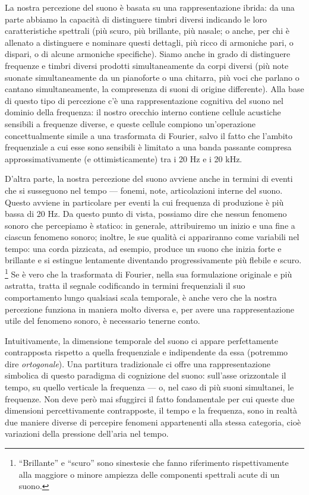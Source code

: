 La nostra percezione del suono è basata su una rappresentazione ibrida: da una parte abbiamo la capacità di distinguere timbri diversi indicando le loro caratteristiche spettrali (più scuro, più brillante, più nasale; o anche, per chi è allenato a distinguere e nominare questi dettagli, più ricco di armoniche pari, o dispari, o di alcune armoniche specifiche). Siamo anche in grado di distinguere frequenze e timbri diversi prodotti simultaneamente da corpi diversi (più note suonate simultaneamente da un pianoforte o una chitarra, più voci che parlano o cantano simultaneamente, la compresenza di suoni di origine differente). Alla base di questo tipo di percezione c'è una rappresentazione cognitiva del suono nel dominio della frequenza: il nostro orecchio interno contiene cellule acustiche sensibili a frequenze diverse, e queste cellule compiono un'operazione concettualmente simile a una trasformata di Fourier, salvo il fatto che l'ambito frequenziale a cui esse sono sensibili è limitato a una banda passante compresa approssimativamente (e ottimisticamente) tra i 20 Hz e i 20 kHz.

D'altra parte, la nostra percezione del suono avviene anche in termini di eventi che si susseguono nel tempo --- fonemi, note, articolazioni interne del suono. Questo avviene in particolare per eventi la cui frequenza di produzione è più bassa di 20 Hz. Da questo punto di vista, possiamo dire che nessun fenomeno sonoro che percepiamo è statico: in generale, attribuiremo un inizio e una fine a ciascun fenomeno sonoro; inoltre, le sue qualità ci appariranno come variabili nel tempo: una corda pizzicata, ad esempio, produce un suono che inizia forte e brillante e si estingue lentamente diventando progressivamente più flebile e scuro.%
\footnote{``Brillante'' e ``scuro'' sono sinestesie che fanno riferimento rispettivamente alla maggiore o minore ampiezza delle componenti spettrali acute di un suono.}
Se è vero che la trasformata di Fourier, nella sua formulazione originale e più astratta, tratta il segnale codificando in termini frequenziali il suo comportamento lungo qualsiasi scala temporale, è anche vero che la nostra percezione funziona in maniera molto diversa e, per avere una rappresentazione utile del fenomeno sonoro, è necessario tenerne conto.

Intuitivamente, la dimensione temporale del suono ci appare perfettamente contrapposta rispetto a quella frequenziale e indipendente da essa (potremmo dire \emph{ortogonale}). Una partitura tradizionale ci offre una rappresentazione simbolica di questo paradigma di cognizione del suono: sull'asse orizzontale il tempo, su quello verticale la frequenza --- o, nel caso di più suoni simultanei, le frequenze. Non deve però mai sfuggirci il fatto fondamentale per cui queste due dimensioni percettivamente contrapposte, il tempo e la frequenza, sono in realtà due maniere diverse di percepire fenomeni appartenenti alla stessa categoria, cioè variazioni della pressione dell'aria nel tempo.

